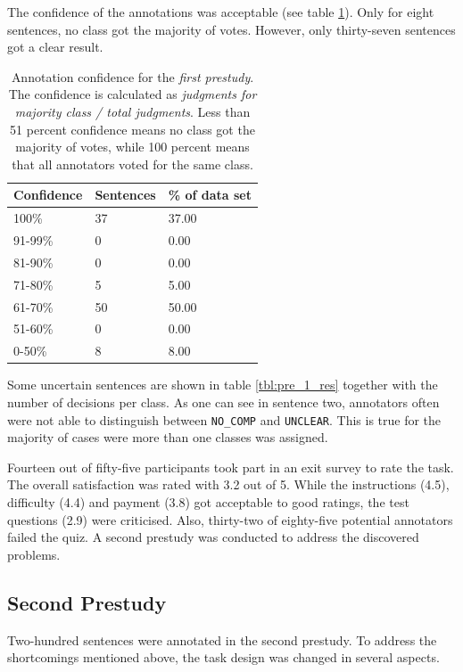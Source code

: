 The confidence of the annotations was acceptable (see table \ref{fig:pre_a_agg}). Only for eight sentences, no class got the majority of votes. However, only thirty-seven sentences got a clear result.

\begin{table}[htbp]
\caption{Annotation confidence for the \emph{first prestudy}. The confidence is calculated as \emph{judgments for majority class / total judgments}. Less than 51 percent confidence means no class got the majority of votes, while 100 percent means that all annotators voted for the same class.}
\label{fig:pre_a_agg}
\begin{tabularx}{\textwidth}{XXX}
\toprule
Confidence & Sentences & \% of data set \\
\midrule
100\%	&	37	&	37.00	 \\ 
91-99\%	&	0	&	0.00	 \\ 
81-90\%	&	0	&	0.00	 \\ 
71-80\%	&	5	&	5.00	 \\ 
61-70\%	&	50	&	50.00	 \\ 
51-60\%	&	0	&	0.00	 \\ 
0-50\%	&	8	&	8.00	 \\ 
\bottomrule
\end{tabularx}
\end{table}




Some uncertain sentences are shown in table \ref{tbl:pre_1_res} together with the number of decisions per class. As one can see in sentence two, annotators often were not able to distinguish between \texttt{NO\_COMP} and \texttt{UNCLEAR}. This is true for the majority of cases were more than one classes was assigned.



Fourteen out of fifty-five participants took part in an exit survey to rate the task. The overall satisfaction was rated with 3.2 out of 5. While the instructions (4.5), difficulty (4.4) and payment (3.8) got acceptable to good ratings, the test questions (2.9) were criticised. Also, thirty-two of eighty-five potential annotators failed the quiz. A second prestudy was conducted to address the discovered problems.


\FloatBarrier
\subsection{Second Prestudy}
Two-hundred sentences were annotated in the second prestudy. To address the shortcomings mentioned above, the task design was changed in several aspects.


